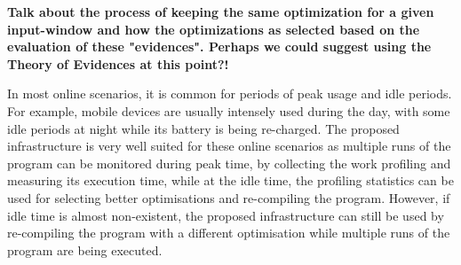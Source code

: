 \textbf{Talk about the process of keeping the same optimization for a given input-window and how the optimizations as selected based on the evaluation of these "evidences". Perhaps we could suggest using the Theory of Evidences at this point?!}

In most online scenarios, it is common for periods of peak usage and idle periods.
For example, mobile devices are usually intensely used during the day, with some idle periods at night while its battery is being re-charged.
The proposed infrastructure is very well suited for these online scenarios as multiple runs of the program can be monitored during peak time, by collecting the work profiling and measuring its execution time, while at the idle time, the profiling statistics can be used for selecting better optimisations and re-compiling the program.
However, if idle time is almost non-existent, the proposed infrastructure can still be used by re-compiling the program with a different optimisation while multiple runs of the program are being executed.
